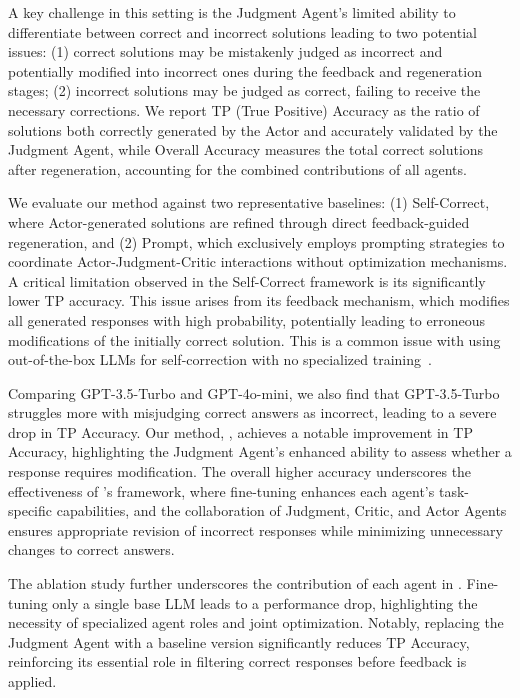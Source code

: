 A key challenge in this setting is the Judgment Agent's limited ability to  differentiate between correct and incorrect solutions leading to two potential issues: (1) correct solutions may be mistakenly judged as incorrect and potentially modified into incorrect ones during the feedback and regeneration stages; (2) incorrect solutions may be judged as correct, failing to receive the necessary corrections.
We report TP (True Positive) Accuracy as the ratio of solutions both correctly generated by the Actor and accurately validated by the Judgment Agent, while Overall Accuracy  measures the total correct solutions after regeneration, accounting for the combined contributions of all agents.

We evaluate our method against two representative baselines: (1) Self-Correct, where Actor-generated solutions are refined through direct feedback-guided regeneration, and (2) Prompt,  which exclusively employs prompting strategies to coordinate Actor-Judgment-Critic interactions without optimization mechanisms.
A critical limitation observed in the Self-Correct framework is its significantly lower TP accuracy. This issue arises from its feedback mechanism, which modifies all generated responses with high probability, potentially leading to erroneous modifications of the initially correct solution. This is a common issue with using out-of-the-box LLMs for self-correction with no specialized training~\citep{kumar2024training}.

Comparing GPT-3.5-Turbo and GPT-4o-mini, we also find that GPT-3.5-Turbo struggles more with misjudging correct answers as incorrect, leading to a severe drop in TP Accuracy. Our method, \model, achieves a notable improvement in TP Accuracy, highlighting the Judgment Agent's enhanced ability to assess whether a response requires modification. The overall higher accuracy underscores the effectiveness of \model's framework, where fine-tuning enhances each agent's task-specific capabilities, and the collaboration of Judgment, Critic, and Actor Agents ensures appropriate revision of incorrect responses while minimizing unnecessary changes to correct answers.

The ablation study further underscores the contribution of each agent in \model. Fine-tuning only a single base LLM leads to a performance drop, highlighting the necessity of specialized agent roles and joint optimization. Notably, replacing the Judgment Agent with a baseline version significantly reduces TP Accuracy, reinforcing its essential role in filtering correct responses before feedback is applied.


